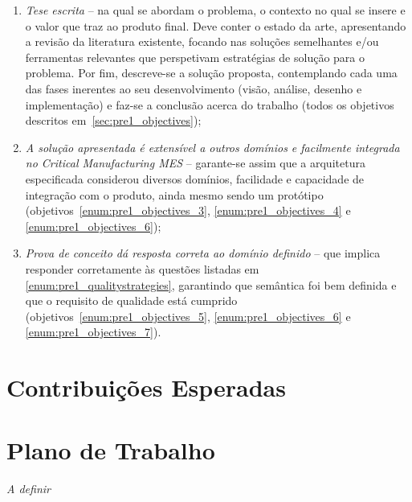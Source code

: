 \begin{enumerate}
    \item 
    {
        \textit{Tese escrita} -- na qual se abordam o problema, o contexto no qual se insere e o valor que traz ao produto final. Deve conter o estado da arte, apresentando a revisão da literatura existente, focando nas soluções semelhantes e/ou ferramentas relevantes que perspetivam estratégias de solução para o problema. Por fim, descreve-se a solução proposta, contemplando cada uma das fases inerentes ao seu desenvolvimento (visão, análise, desenho e implementação) e faz-se a conclusão acerca do trabalho (todos os objetivos descritos em~\ref{sec:pre1_objectives});
    }
    \item
    {
        \textit{A solução apresentada é extensível a outros domínios e facilmente integrada no Critical Manufacturing \gls{MES}} -- garante-se assim que a arquitetura especificada considerou diversos domínios, facilidade e capacidade de integração com o produto, ainda mesmo sendo um protótipo (objetivos~\ref{enum:pre1_objectives_3}, \ref{enum:pre1_objectives_4} e \ref{enum:pre1_objectives_6});
    }
    \item
    {
        \textit{Prova de conceito dá resposta correta ao domínio definido} -- que implica responder corretamente às questões listadas em \ref{enum:pre1_qualitystrategies}, garantindo que semântica foi bem definida e que o requisito de qualidade está cumprido (objetivos~\ref{enum:pre1_objectives_5}, \ref{enum:pre1_objectives_6} e \ref{enum:pre1_objectives_7}).
    }
\end{enumerate}

\chapter{Contribuições Esperadas}
\label{chap:pre2}







\chapter{Plano de Trabalho}
\label{chap:pre7}
\textit{A definir}
